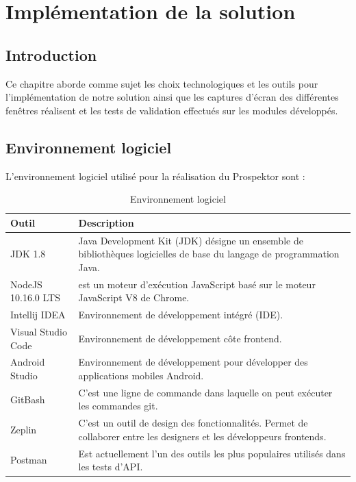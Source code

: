 \chapter{Impl\'ementation de la solution}

\section{Introduction}

Ce chapitre aborde comme sujet les choix technologiques et les outils pour l'impl\'ementation de notre solution ainsi que les captures d'\'ecran des diff\'erentes fen\^etres r\'ealisent et les tests de validation effectu\'es sur les modules d\'evelopp\'es.

\section{Environnement logiciel}
L'environnement logiciel utilis\'e pour la r\'ealisation du Prospektor sont :

\begin{table}[H]
\begin{center}
\begin{tabularx}{\textwidth}{ |l|X| }
\hline Outil & Description \\\hline \hline
JDK 1.8 & Java Development Kit (JDK) d\'esigne un ensemble de biblioth\`eques logicielles de base du langage de programmation Java.\\ \hline
NodeJS 10.16.0 LTS & est un moteur d'ex\'ecution JavaScript bas\'e sur le moteur JavaScript V8 de Chrome.\\ \hline
Intellij IDEA & Environnement de d\'eveloppement int\'egr\'e (IDE).\\ \hline
Visual Studio Code & Environnement de d\'eveloppement c\^ote frontend.\\ \hline
Android Studio & Environnement de d\'eveloppement pour d\'evelopper des applications mobiles Android.\\ \hline
GitBash & C'est une ligne de commande dans laquelle on peut ex\'ecuter les commandes git.\\ \hline
Zeplin & C'est un outil de design des fonctionnalit\'es. Permet de collaborer entre les designers et les d\'eveloppeurs frontends.\\ \hline
Postman & Est actuellement l'un des outils les plus populaires utilis\'es dans les tests d'\gls{API}.\\
\hline
\end{tabularx}
\caption{Environnement logiciel}
\end{center}
\end{table}

